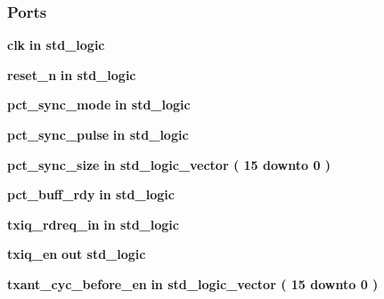 \subsubsection*{Ports}
 \begin{DoxyCompactItemize}
\item 
{\bf clk}  {\bfseries {\bfseries \textcolor{keywordflow}{in}\textcolor{vhdlchar}{ }}} {\bfseries \textcolor{comment}{std\+\_\+logic}\textcolor{vhdlchar}{ }} 
\item 
{\bf reset\+\_\+n}  {\bfseries {\bfseries \textcolor{keywordflow}{in}\textcolor{vhdlchar}{ }}} {\bfseries \textcolor{comment}{std\+\_\+logic}\textcolor{vhdlchar}{ }} 
\item 
{\bf pct\+\_\+sync\+\_\+mode}  {\bfseries {\bfseries \textcolor{keywordflow}{in}\textcolor{vhdlchar}{ }}} {\bfseries \textcolor{comment}{std\+\_\+logic}\textcolor{vhdlchar}{ }} 
\item 
{\bf pct\+\_\+sync\+\_\+pulse}  {\bfseries {\bfseries \textcolor{keywordflow}{in}\textcolor{vhdlchar}{ }}} {\bfseries \textcolor{comment}{std\+\_\+logic}\textcolor{vhdlchar}{ }} 
\item 
{\bf pct\+\_\+sync\+\_\+size}  {\bfseries {\bfseries \textcolor{keywordflow}{in}\textcolor{vhdlchar}{ }}} {\bfseries \textcolor{comment}{std\+\_\+logic\+\_\+vector}\textcolor{vhdlchar}{ }\textcolor{vhdlchar}{(}\textcolor{vhdlchar}{ }\textcolor{vhdlchar}{ } \textcolor{vhdldigit}{15} \textcolor{vhdlchar}{ }\textcolor{keywordflow}{downto}\textcolor{vhdlchar}{ }\textcolor{vhdlchar}{ } \textcolor{vhdldigit}{0} \textcolor{vhdlchar}{ }\textcolor{vhdlchar}{)}\textcolor{vhdlchar}{ }} 
\item 
{\bf pct\+\_\+buff\+\_\+rdy}  {\bfseries {\bfseries \textcolor{keywordflow}{in}\textcolor{vhdlchar}{ }}} {\bfseries \textcolor{comment}{std\+\_\+logic}\textcolor{vhdlchar}{ }} 
\item 
{\bf txiq\+\_\+rdreq\+\_\+in}  {\bfseries {\bfseries \textcolor{keywordflow}{in}\textcolor{vhdlchar}{ }}} {\bfseries \textcolor{comment}{std\+\_\+logic}\textcolor{vhdlchar}{ }} 
\item 
{\bf txiq\+\_\+en}  {\bfseries {\bfseries \textcolor{keywordflow}{out}\textcolor{vhdlchar}{ }}} {\bfseries \textcolor{comment}{std\+\_\+logic}\textcolor{vhdlchar}{ }} 
\item 
{\bf txant\+\_\+cyc\+\_\+before\+\_\+en}  {\bfseries {\bfseries \textcolor{keywordflow}{in}\textcolor{vhdlchar}{ }}} {\bfseries \textcolor{comment}{std\+\_\+logic\+\_\+vector}\textcolor{vhdlchar}{ }\textcolor{vhdlchar}{(}\textcolor{vhdlchar}{ }\textcolor{vhdlchar}{ } \textcolor{vhdldigit}{15} \textcolor{vhdlchar}{ }\textcolor{keywordflow}{downto}\textcolor{vhdlchar}{ }\textcolor{vhdlchar}{ } \textcolor{vhdldigit}{0} \textcolor{vhdlchar}{ }\textcolor{vhdlchar}{)}\textcolor{vhdlchar}{ }} 

\end{DoxyCompactItemize}

